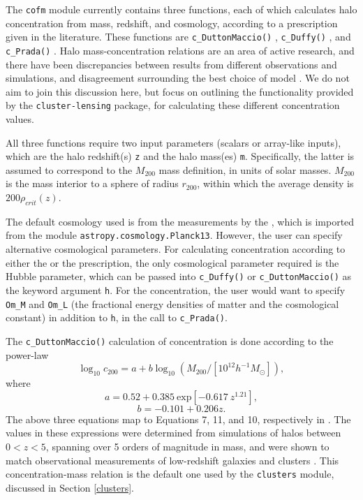 \documentclass[twocolumn]{aastex6}
\newcommand{\code}{\lstinline[style=codeintext]}
\begin{document}
The \code{cofm} module currently contains three functions, each of which calculates halo concentration from mass, redshift, and cosmology, according to a prescription given in the literature. These functions are \code{c_DuttonMaccio()} \citep[for calculations following][]{Dutton14}, \code{c_Duffy()} \citep[following][]{Duffy08}, and \code{c_Prada()} \citep[for][]{Prada12}. Halo mass-concentration relations are an area of active research, and there have been discrepancies between results from different observations and simulations, and disagreement surrounding the best choice of model \citep[see e.g.][]{Dutton14, Klypin16}. We do not aim to join this discussion here, but focus on outlining the functionality provided by the \code{cluster-lensing} package, for calculating these different concentration values.

All three functions require two input parameters (scalars or array-like inputs), which are the halo redshift(s) \code{z} and the halo mass(es) \code{m}. Specifically, the latter is assumed to correspond to the $M_{200}$ mass definition, in units of solar masses. $M_{200}$ is the mass interior to a sphere of radius $r_{200}$, within which the average density is $200\rho_{crit}(z)$.

The default cosmology used is from the measurements by the \citet{PlanckXVI}, which is imported from the module \code{astropy.cosmology.Planck13}. However, the user can specify alternative cosmological parameters. For calculating concentration according to either the \citet{Duffy08} or the \citet{Dutton14} prescription, the only cosmological parameter required is the Hubble parameter, which can be passed into \code{c_Duffy()} or \code{c_DuttonMaccio()} as the keyword argument \code{h}. For the \citet{Prada12} concentration, the user would want to specify \code{Om_M} and \code{Om_L} (the fractional energy densities of matter and the cosmological constant) in addition to \code{h}, in the call to \code{c_Prada()}.

The \code{c_DuttonMaccio()} calculation of concentration is done according to the power-law
\begin{equation}
\log_{10} c_{200} = a + b \log_{10}(M_{200} / [10^{12} h^{-1} M_{\odot}]),
\end{equation}
where
\begin{equation}
a = 0.52 + 0.385\ \mathrm{exp}[-0.617\ z^{1.21}],
\end{equation}
\begin{equation}
b = -0.101 + 0.206 z.
\end{equation}
The above three equations map to Equations 7, 11, and 10, respectively in \citet{Dutton14}. The values in these expressions were determined from simulations of halos between $0 < z < 5$, spanning over 5 orders of magnitude in mass, and were shown to match observational measurements of low-redshift galaxies and clusters \citep{Dutton14}. This concentration-mass relation is the default one used by the \code{clusters} module, discussed in Section \ref{clusters}.
\end{document}
